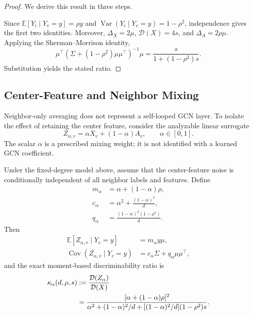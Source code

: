 \begin{proof}
We derive this result in three steps.

Since $\mathbb{E}[Y_i\mid Y_v=y]=\rho y$ and
$\operatorname{Var}(Y_i\mid Y_v=y)=1-\rho^2$, independence gives the first two identities. Moreover, $\Delta_X=2\mu$, $\mathcal{D}(X)=4s$, and $\Delta_A=2\rho\mu$. Applying the Sherman--Morrison identity,
\begin{equation}
 \mu^\top\left(\Sigma+(1-\rho^2)\mu\mu^\top\right)^{-1}\mu
 =\frac{s}{1+(1-\rho^2)s}.
\end{equation}
Substitution yields the stated ratio.
\end{proof}

\subsection{Center-Feature and Neighbor Mixing}

Neighbor-only averaging does not represent a self-looped GCN layer. To isolate the effect of retaining the center feature, consider the analyzable linear surrogate
\begin{equation}
    Z_{\alpha,v}=\alpha X_v+(1-\alpha)A_v,
    \qquad \alpha\in[0,1].
    \label{eq:self_neighbor_operator}
\end{equation}
The scalar $\alpha$ is a prescribed mixing weight; it is not identified with a learned GCN coefficient.

\begin{proposition}
\label{prop:self_neighbor_mixing}
Under the fixed-degree model above, assume that the center-feature noise is conditionally independent of all neighbor labels and features. Define
\begin{align}
    m_\alpha &= \alpha+(1-\alpha)\rho,\\
    c_\alpha &= \alpha^2+\frac{(1-\alpha)^2}{d},\\
    q_\alpha &= \frac{(1-\alpha)^2(1-\rho^2)}{d}.
\end{align}
Then
\begin{align}
    \mathbb{E}[Z_{\alpha,v}\mid Y_v=y]
        &=m_\alpha y\mu,\\
    \operatorname{Cov}(Z_{\alpha,v}\mid Y_v=y)
        &=c_\alpha\Sigma+q_\alpha\mu\mu^\top,
\end{align}
and the exact moment-based discriminability ratio is
\begin{align}
    \kappa_\alpha(d,\rho,s)
    &:=\frac{\mathcal{D}(Z_\alpha)}{\mathcal{D}(X)} \notag\\
    &=\frac{[\alpha+(1-\alpha)\rho]^2}
    {\alpha^2+(1-\alpha)^2/d
    +[(1-\alpha)^2/d](1-\rho^2)s}.
    \label{eq:kappa_alpha}
\end{align}
\end{proposition}

